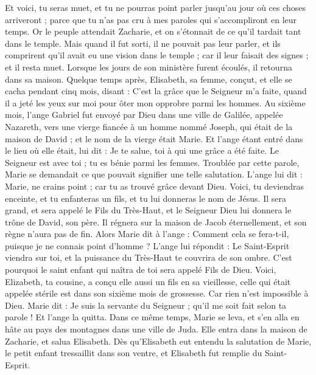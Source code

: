 \begin{multicols}{2}
Et voici, tu seras muet, et tu ne pourras point parler jusqu'au jour où ces choses arriveront ; parce que tu n'as pas cru à mes paroles qui s'accompliront en leur temps.
Or le peuple attendait Zacharie, et on s'étonnait de ce qu'il tardait tant dans le temple.
Mais quand il fut sorti, il ne pouvait pas leur parler, et ils comprirent qu'il avait eu une vision dans le temple ; car il leur faisait des signes ; et il resta muet.
Lorsque les jours de son ministère furent écoulés, il retourna dans sa maison.
Quelque temps après, Elisabeth, sa femme, conçut, et elle se cacha pendant cinq mois, disant :
C’est la grâce que le Seigneur m’a faite, quand il a jeté les yeux sur moi pour ôter mon opprobre parmi les hommes.
Au sixième mois, l’ange Gabriel fut envoyé par Dieu dans une ville de Galilée, appelée Nazareth,
vers une vierge fiancée à un homme nommé Joseph, qui était de la maison de David ; et le nom de la vierge était Marie.
Et l'ange étant entré dans le lieu où elle était, lui dit : Je te salue, toi à qui une grâce a été faite. Le Seigneur est avec toi ; tu es bénie parmi les femmes.
Troublée par cette parole, Marie se demandait ce que pouvait signifier une telle salutation.
L’ange lui dit : Marie, ne crains point ; car tu as trouvé grâce devant Dieu.
Voici, tu deviendras enceinte, et tu enfanteras un fils, et tu lui donneras le nom de Jésus.
Il sera grand, et sera appelé le Fils du Très-Haut, et le Seigneur Dieu lui donnera le trône de David, son père.
Il régnera sur la maison de Jacob éternellement, et son règne n’aura pas de fin.
Alors Marie dit à l'ange : Comment cela se fera-t-il, puisque je ne connais point d’homme ?
L’ange lui répondit : Le Saint-Esprit viendra sur toi, et la puissance du Très-Haut te couvrira de son ombre. C’est pourquoi le saint enfant qui naîtra de toi sera appelé Fils de Dieu.
Voici, Elizabeth, ta cousine, a conçu elle aussi un fils en sa vieillesse, celle qui était appelée stérile est dans son sixième mois de grossesse.
Car rien n’est impossible à Dieu.
Marie dit : Je suis la servante du Seigneur ; qu'il me soit fait selon ta parole ! Et l'ange la quitta.
Dans ce même temps, Marie se leva, et s'en alla en hâte au pays des montagnes dans une ville de Juda.
Elle entra dans la maison de Zacharie, et salua Elisabeth.
Dès qu'Elisabeth eut entendu la salutation de Marie, le petit enfant tressaillit dans son ventre, et Elisabeth fut remplie du Saint-Esprit.

\end{multicols}
